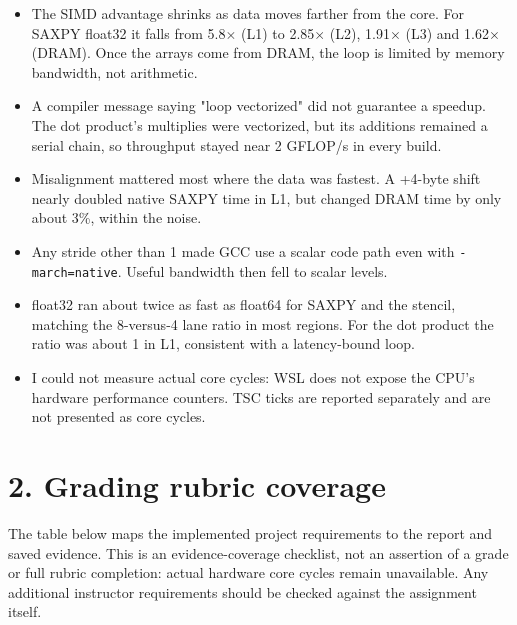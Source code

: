 \documentclass[10pt,letterpaper]{article}
\begin{document}
\begin{itemize}\setlength{\itemsep}{2pt}

\item The SIMD advantage shrinks as data moves farther from the core. For SAXPY float32 it falls from 5.8$\times$ (L1) to 2.85$\times$ (L2), 1.91$\times$ (L3) and 1.62$\times$ (DRAM). Once the arrays come from DRAM, the loop is limited by memory bandwidth, not arithmetic.

\item A compiler message saying "loop vectorized" did not guarantee a speedup. The dot product's multiplies were vectorized, but its additions remained a serial chain, so throughput stayed near 2 GFLOP/s in every build.

\item Misalignment mattered most where the data was fastest. A +4-byte shift nearly doubled native SAXPY time in L1, but changed DRAM time by only about 3\%, within the noise.

\item Any stride other than 1 made GCC use a scalar code path even with \texttt{-march=native}. Useful bandwidth then fell to scalar levels.

\item float32 ran about twice as fast as float64 for SAXPY and the stencil, matching the 8-versus-4 lane ratio in most regions. For the dot product the ratio was about 1 in L1, consistent with a latency-bound loop.

\item I could not measure actual core cycles: WSL does not expose the CPU's hardware performance counters. TSC ticks are reported separately and are not presented as core cycles.

\end{itemize}

\section*{2. Grading rubric coverage}

The table below maps the implemented project requirements to the report and saved evidence. This is an evidence-coverage checklist, not an assertion of a grade or full rubric completion: actual hardware core cycles remain unavailable. Any additional instructor requirements should be checked against the assignment itself.
\end{document}
